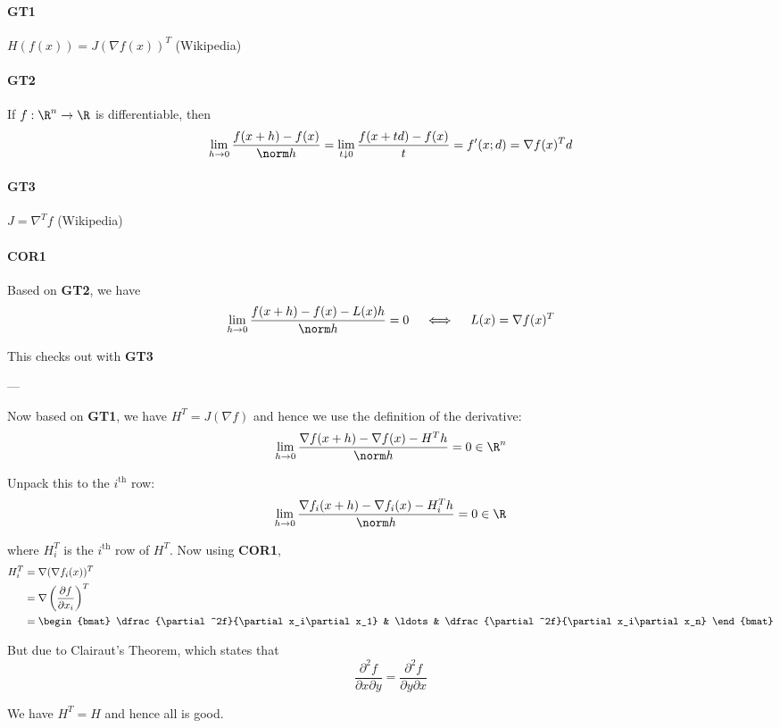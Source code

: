 \newpage

\paragraph{GT1} $H(f(x))=J(\nabla f(x))^T$ (Wikipedia)
\paragraph{GT2} If $f:\R^n\to\R$ is differentiable, then
$$
  \lim_{h\to0}\frac{f(x+h)-f(x)}{\norm h}
  =\lim_{t\downarrow0}\frac{f(x+td)-f(x)}t
  =f'(x;d)
  =\nabla f(x)^Td
$$
\paragraph{GT3} $J=\nabla^Tf$ (Wikipedia)

\paragraph{COR1} Based on \textbf{GT2}, we have
$$
  \lim_{h\to0}\frac{f(x+h)-f(x)-L(x)h}{\norm h}=0\quad\iff\quad L(x)=\nabla f(x)^T
$$

This checks out with \textbf{GT3}

---

Now based on \textbf{GT1}, we have $H^T=J(\nabla f)$ and hence we use the
definition of the derivative:
\begin{align*}
  \lim_{h\to0}\frac{\nabla f(x+h)-\nabla f(x)-H^Th}{\norm h}=0\in\R^n
\end{align*}

Unpack this to the $i^\text{th}$ row:
\begin{align*}
  \lim_{h\to0}\frac{\nabla f_i(x+h)-\nabla f_i(x)-H_i^Th}{\norm h}=0\in\R
\end{align*}

where $H_i^T$ is the $i^\text{th}$ row of $H^T$. Now using \textbf{COR1},
\begin{align*}
  H_i^T
   &=\nabla(\nabla f_i(x))^T                              \\
   &=\nabla\left(\frac{\partial f}{\partial x_i}\right)^T \\
   &=\begin{bmat}
       \dfrac{\partial^2f}{\partial x_i\partial x_1} &
       \ldots                                        &
       \dfrac{\partial^2f}{\partial x_i\partial x_n}
     \end{bmat}
\end{align*}

But due to Clairaut's Theorem, which states that
$$
  \frac{\partial^2f}{\partial x\partial y}=
  \frac{\partial^2f}{\partial y\partial x}
$$

We have $H^T=H$ and hence all is good.